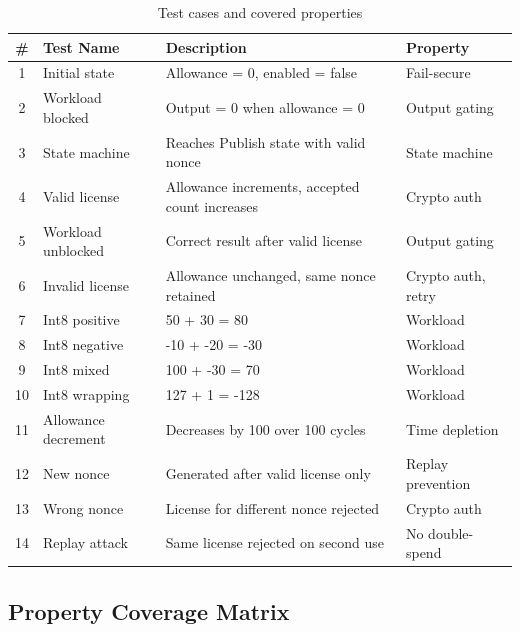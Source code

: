 \documentclass[11pt]{article}
\begin{document}
\begin{table}[h]
\centering
\begin{tabular}{@{}clp{5.5cm}l@{}}
\toprule
\textbf{\#} & \textbf{Test Name} & \textbf{Description} & \textbf{Property} \\
\midrule
1 & Initial state & Allowance = 0, enabled = false & Fail-secure \\
\midrule
2 & Workload blocked & Output = 0 when allowance = 0 & Output gating \\
\midrule
3 & State machine & Reaches Publish state with valid nonce & State machine \\
\midrule
4 & Valid license & Allowance increments, accepted count increases & Crypto auth \\
\midrule
5 & Workload unblocked & Correct result after valid license & Output gating \\
\midrule
6 & Invalid license & Allowance unchanged, same nonce retained & Crypto auth, retry \\
\midrule
7 & Int8 positive & 50 + 30 = 80 & Workload \\
\midrule
8 & Int8 negative & -10 + -20 = -30 & Workload \\
\midrule
9 & Int8 mixed & 100 + -30 = 70 & Workload \\
\midrule
10 & Int8 wrapping & 127 + 1 = -128 & Workload \\
\midrule
11 & Allowance decrement & Decreases by 100 over 100 cycles & Time depletion \\
\midrule
12 & New nonce & Generated after valid license only & Replay prevention \\
\midrule
13 & Wrong nonce & License for different nonce rejected & Crypto auth \\
\midrule
14 & Replay attack & Same license rejected on second use & No double-spend \\
\bottomrule
\end{tabular}
\caption{Test cases and covered properties}
\end{table}

\subsection{Property Coverage Matrix}
\end{document}
